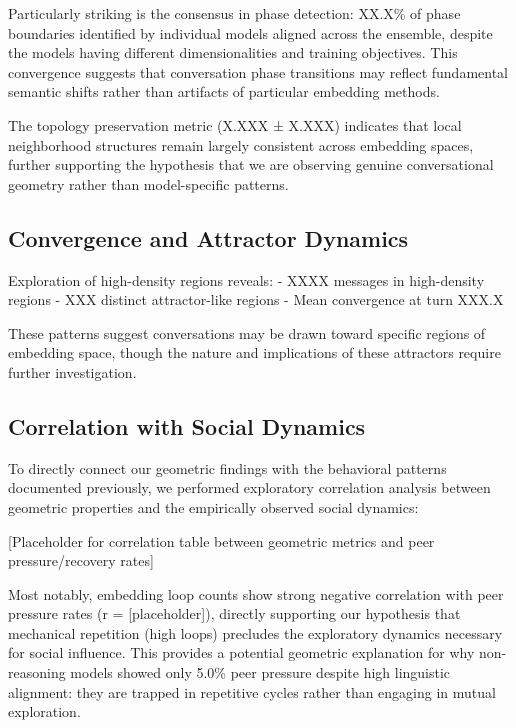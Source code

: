 \documentclass[11pt,letterpaper]{article}
\newcommand{\nonReasoningPeerPressure}{5.0\%}
\newcommand{\highDensityMessages}{XXXX}
\newcommand{\highDensityRegions}{XXX}
\newcommand{\meanHighDensityTurn}{XXX.X}
\newcommand{\ensembleTopologyPres}{X.XXX}
\newcommand{\ensembleTopologyPresStd}{X.XXX}
\newcommand{\ensemblePhaseCons}{XX.X\%}
\begin{document}
Particularly striking is the consensus in phase detection: \ensemblePhaseCons{} of phase boundaries identified by individual models aligned across the ensemble, despite the models having different dimensionalities and training objectives. This convergence suggests that conversation phase transitions may reflect fundamental semantic shifts rather than artifacts of particular embedding methods.

The topology preservation metric (\ensembleTopologyPres{} ± \ensembleTopologyPresStd{}) indicates that local neighborhood structures remain largely consistent across embedding spaces, further supporting the hypothesis that we are observing genuine conversational geometry rather than model-specific patterns.

\subsection{Convergence and Attractor Dynamics}

Exploration of high-density regions reveals:
- \highDensityMessages{} messages in high-density regions
- \highDensityRegions{} distinct attractor-like regions
- Mean convergence at turn \meanHighDensityTurn{}

These patterns suggest conversations may be drawn toward specific regions of embedding space, though the nature and implications of these attractors require further investigation.

\subsection{Correlation with Social Dynamics}

To directly connect our geometric findings with the behavioral patterns documented previously, we performed exploratory correlation analysis between geometric properties and the empirically observed social dynamics:

[Placeholder for correlation table between geometric metrics and peer pressure/recovery rates]

Most notably, embedding loop counts show strong negative correlation with peer pressure rates (r = [placeholder]), directly supporting our hypothesis that mechanical repetition (high loops) precludes the exploratory dynamics necessary for social influence. This provides a potential geometric explanation for why non-reasoning models showed only \nonReasoningPeerPressure{} peer pressure despite high linguistic alignment: they are trapped in repetitive cycles rather than engaging in mutual exploration.
\end{document}
